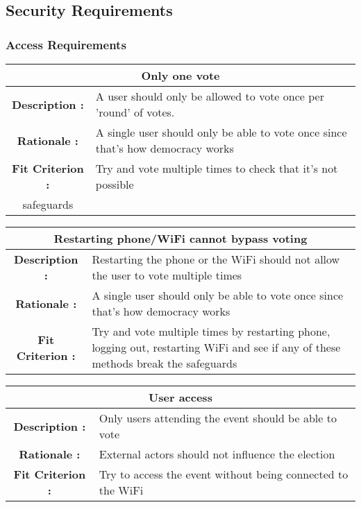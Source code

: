 \documentclass[12pt, titlepage]{article}
\begin{document}
\subsection{Security Requirements}
\subsubsection{Access Requirements}

\begin{center}
\begin{table}[H]
\begin{tabularx}{\textwidth}{| c X |}
\hline
\multicolumn{2}{|c|}{\textbf{Only one vote}}\\
\hline
\textbf{Description : } & A user should only be allowed to vote once per 'round'
of votes.\\
\hline
\textbf{Rationale : } & A single user should only be able to vote once since
that's how democracy works\\
\hline
\textbf{Fit Criterion : } & Try and vote multiple times to check that it's not
possible\\
safeguards\\
\hline
\end{tabularx}
\end{table}
\end{center}

\begin{center}
\begin{table}[H]
\begin{tabularx}{\textwidth}{| c X |}
\hline
\multicolumn{2}{|c|}{\textbf{Restarting phone/WiFi cannot bypass voting}}\\
\hline
\textbf{Description : } & Restarting the phone or the WiFi should not allow
the user to vote multiple times\\
\hline
\textbf{Rationale : } & A single user should only be able to vote once since
that's how democracy works\\
\hline
\textbf{Fit Criterion : } & Try and vote multiple times by restarting phone,
logging out, restarting WiFi and see if any of these methods break the
safeguards\\
\hline
\end{tabularx}
\end{table}
\end{center}

\begin{center}
\begin{table}[H]
\begin{tabularx}{\textwidth}{| c X |}
\hline
\multicolumn{2}{|c|}{\textbf{User access}}\\
\hline
\textbf{Description : } & Only users attending the event should be able to vote\\
\hline
\textbf{Rationale : } & External actors should not influence the election\\
\hline
\textbf{Fit Criterion : } & Try to access the event without being connected to
the WiFi\\
\hline
\end{tabularx}
\end{table}
\end{center}
\end{document}
